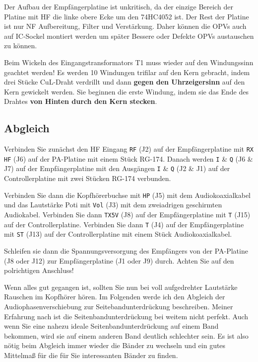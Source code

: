 \documentclass[10pt, a4paper]{paper}
\newcommand{\warn}[1]{{\color{red} #1}}
\newcommand{\con}[1]{\texttt{#1}}
\begin{document}
Der Aufbau der Empfängerplatine ist unkritisch, da der einzige Bereich der Platine mit HF die linke obere Ecke um den 74HC4052 ist. Der Rest der Platine ist nur NF Aufbereitung, Filter und Verstärkung. Daher können die OPVs auch auf IC-Sockel montiert werden um später Bessere oder Defekte OPVs austauschen zu können. 

Beim Wickeln des Eingangstransformators T1 \warn{muss wieder auf den Windungssinn geachtet werden!} Es werden 10 Windungen trifilar auf den Kern gebracht, indem drei Stücke CuL-Draht verdrillt und dann \textbf{gegen den Uhrzeigersinn} auf den Kern gewickelt werden. Sie beginnen die erste Windung, indem sie das Ende des Drahtes \textbf{von Hinten durch den Kern stecken}.

\subsection{Abgleich}
Verbinden Sie zunächst den HF Eingang \con{RF} (J2) auf der Emp\-fän\-ger\-pla\-ti\-ne mit \con{RX HF} (J6) auf der PA-Platine mit einem Stück RG-174. Danach werden \con{I} \& \con{Q} (J6 \& J7) auf der Empfängerplatine mit den Ausgängen \con{I} \& \con{Q} (J2 \& J1) auf der Controllerplatine mit zwei Stücken RG-174 verbunden. 

Verbinden Sie dann die Kopf\-hö\-rer\-buch\-se mit \con{HP} (J5) mit dem Audiokoaxialkabel und das Lautstärke Poti mit \con{Vol} (J3) mit dem zweiadrigen geschirmten Audiokabel. Verbinden Sie dann \con{TX5V} (J8) auf der Empfängerplatine mit \con{T} (J15) auf der Controllerplatine. Verbinden Sie dann \con{T} (J4) auf der Empfängerplatine mit \con{ST} (J13) auf der Controllerplatine mit einem Stück Audiokoaxialkabel. 

Schleifen sie dann die Spannungsversorgung des Empfängers von der PA-Platine (J8 oder J12) zur Empfängerplatine (J1 oder J9) durch. \warn{Achten Sie auf den polrichtigen Anschluss!}

Wenn alles gut gegangen ist, sollten Sie nun bei voll aufgedrehter Lautstärke Rauschen im Kopfhörer hören. Im Folgenden werde ich den Abgleich der Audiophasenverschiebung zur Seitebandunterdrückung beschreiben. Meiner Erfahrung nach ist die Seitenbandunterdrückung bei weitem nicht perfekt. Auch wenn Sie eine nahezu ideale Seitenbandunterdrückung auf einem Band bekommen, wird sie auf einem anderen Band deutlich schlechter sein. Es ist also nötig beim Abgleich immer wieder die Bänder zu wechseln und ein gutes Mittelmaß für die für Sie interessanten Bänder zu finden. 
\end{document}
